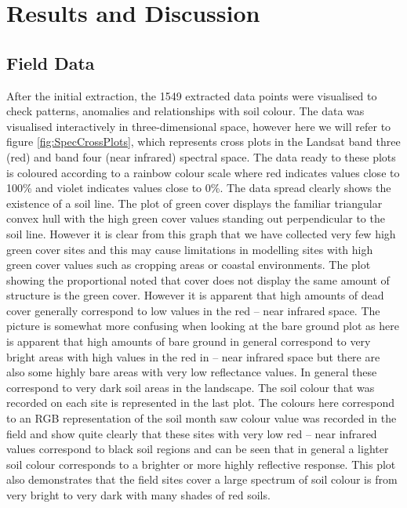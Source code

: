 \documentclass[remotesensing,article,accept,moreauthors,pdftex,12pt,a4paper]{mdpi}
\begin{document}

\section{Results and Discussion}

\subsection{Field Data}

After the initial extraction, the 1549 extracted data points were visualised to check patterns, anomalies and relationships with soil colour. The data was visualised interactively in three-dimensional space, however here we will refer to figure \ref{fig:SpecCrossPlots}, which represents cross plots in the Landsat band three (red) and band four (near infrared) spectral space. The data ready to these plots is coloured according to a rainbow colour scale where red indicates values close to 100\% and violet indicates values close to 0\%. The data spread clearly shows the existence of a soil line. The plot of green cover displays the familiar triangular convex hull with the high green cover values standing out perpendicular to the soil line. However it is clear from this graph that we have collected very few high green cover sites and this may cause limitations in modelling sites with high green cover values such as cropping areas or coastal environments. The plot showing the proportional noted that cover does not display the same amount of structure is the green cover. However it is apparent that high amounts of dead cover generally correspond to low values in the red -- near infrared space. The picture is somewhat more confusing when looking at the bare ground plot as here is apparent that high amounts of bare ground in general correspond to very bright areas with high values in the red in -- near infrared space but there are also some highly bare areas with very low reflectance values. In general these correspond to very dark soil areas in the landscape. The soil colour that was recorded on each site is represented in the last plot. The colours here correspond to an RGB representation of the soil month saw colour value was recorded in the field and show quite clearly that these sites with very low red -- near infrared values correspond to black soil regions and can be seen that in general a lighter soil colour corresponds to a brighter or more highly reflective response. This plot also demonstrates that the field sites cover a large spectrum of soil colour is from very bright to very dark with many shades of red soils.
\end{document}
